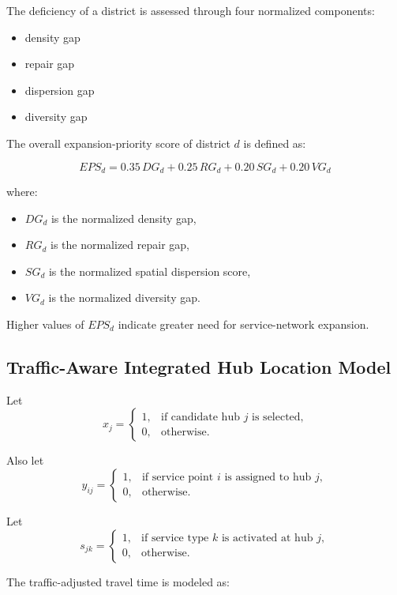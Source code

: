 The deficiency of a district is assessed through four normalized components:
\begin{itemize}
    \item density gap
    \item repair gap
    \item dispersion gap
    \item diversity gap
\end{itemize}

The overall expansion-priority score of district $d$ is defined as:

\begin{equation}
EPS_d = 0.35 \, DG_d + 0.25 \, RG_d + 0.20 \, SG_d + 0.20 \, VG_d
\end{equation}

where:
\begin{itemize}
    \item $DG_d$ is the normalized density gap,
    \item $RG_d$ is the normalized repair gap,
    \item $SG_d$ is the normalized spatial dispersion score,
    \item $VG_d$ is the normalized diversity gap.
\end{itemize}

Higher values of $EPS_d$ indicate greater need for service-network expansion.

\subsection{Traffic-Aware Integrated Hub Location Model}

Let
\[
x_j =
\begin{cases}
1, & \text{if candidate hub } j \text{ is selected,} \\
0, & \text{otherwise.}
\end{cases}
\]

Also let
\[
y_{ij} =
\begin{cases}
    1, & \text{if service point } i \text{ is assigned to hub } j, \\
    0, & \text{otherwise.}
\end{cases}
\]

Let
\[
s_{jk} =
\begin{cases}
1, & \text{if service type } k \text{ is activated at hub } j, \\
0, & \text{otherwise.}
\end{cases}
\]

The traffic-adjusted travel time is modeled as:

